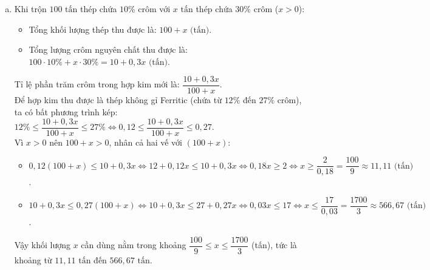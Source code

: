\begin{bt}
{\begin{enumerate}[a)]
	Vậy cần dùng $350\text{ tấn}$ thép chứa $10\%$ crôm và $150\text{ tấn}$ thép chứa $30\%$ crôm.
	\item Khi trộn $100\text{ tấn}$ thép chứa $10\%$ crôm với $x\text{ tấn}$ thép chứa $30\%$ crôm ($x > 0$):
	\begin{itemize}
		\item Tổng khối lượng thép thu được là: $100 + x\text{ (tấn)}$.
		\item Tổng lượng crôm nguyên chất thu được là: $100\cdot 10\% + x\cdot 30\% = 10 + 0{,}3x\text{ (tấn)}$.
	\end{itemize}
	Tỉ lệ phần trăm crôm trong hợp kim mới là: $\dfrac{10 + 0{,}3x}{100 + x}$.\\
	Để hợp kim thu được là thép không gỉ Ferritic (chứa từ $12\%$ đến $27\%$ crôm), ta có bất phương trình kép:
	$12\% \le \dfrac{10 + 0{,}3x}{100 + x} \le 27\% \Leftrightarrow 0{,}12 \le \dfrac{10 + 0{,}3x}{100 + x} \le 0{,}27$.\\
	Vì $x > 0$ nên $100 + x > 0$, nhân cả hai vế với $(100 + x)$:
	\begin{itemize}
		\item $0{,}12(100 + x) \le 10 + 0{,}3x \Leftrightarrow 12 + 0{,}12x \le 10 + 0{,}3x \Leftrightarrow 0{,}18x \ge 2 \Leftrightarrow x \ge \dfrac{2}{0{,}18} = \dfrac{100}{9} \approx 11{,}11\text{ (tấn)}$.
		\item $10 + 0{,}3x \le 0{,}27(100 + x) \Leftrightarrow 10 + 0{,}3x \le 27 + 0{,}27x \Leftrightarrow 0{,}03x \le 17 \Leftrightarrow x \le \dfrac{17}{0{,}03} = \dfrac{1700}{3} \approx 566{,}67\text{ (tấn)}$.
	\end{itemize}
	Vậy khối lượng $x$ cần dùng nằm trong khoảng $\dfrac{100}{9} \le x \le \dfrac{1700}{3}$ (tấn), tức là khoảng từ $11{,}11\text{ tấn}$ đến $566{,}67\text{ tấn}$.
\end{enumerate}
}
\end{bt}

